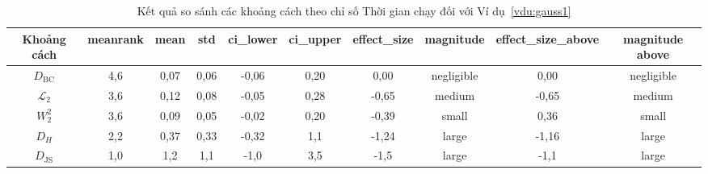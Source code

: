 \documentclass[a4paper,oneside]{book} %
\theoremstyle{plain}
\theoremstyle{plain}
\theoremstyle{nonumberplain}
\begin{document}
\begin{spacing}{1.0}
\begin{landscape}
	
	\begin{table}[H]
		\centering
		\fontsize{11pt}{14pt}\selectfont
		\caption{Kết quả so sánh các khoảng cách theo chỉ số Thời gian chạy đối với Ví dụ~\ref{vdu:gauss1}}
		\begin{tabular}{cccccccccc}
			\toprule
			{Khoảng cách} & meanrank & mean & std & ci\_lower & ci\_upper & effect\_size & magnitude & effect\_size\_above & magnitude above \\
			\midrule
			$D_{\mathrm{BC}}$       & 4{,}6 & 0{,}07 & 0{,}06 & -0{,}06 & 0{,}20 &  0{,}00 & negligible &  0{,}00 & negligible \\
			$\mathcal{L}_2$         & 3{,}6 & 0{,}12 & 0{,}08 & -0{,}05 & 0{,}28 & -0{,}65 & medium     & -0{,}65 & medium \\
			$W^2_2$                 & 3{,}6 & 0{,}09 & 0{,}05 & -0{,}02 & 0{,}20 & -0{,}39 & small      &  0{,}36 & small \\
			$D_{H}$                 & 2{,}2 & 0{,}37 & 0{,}33 & -0{,}32 & 1{,}1  & -1{,}24 & large      & -1{,}16 & large \\
			$D_{\mathrm{JS}}$       & 1{,}0 & 1{,}2  & 1{,}1  & -1{,}0  & 3{,}5  & -1{,}5  & large      & -1{,}1  & large \\
			\bottomrule
		\end{tabular}
	\end{table}
	
\end{landscape}



\end{spacing}












\end{document}
